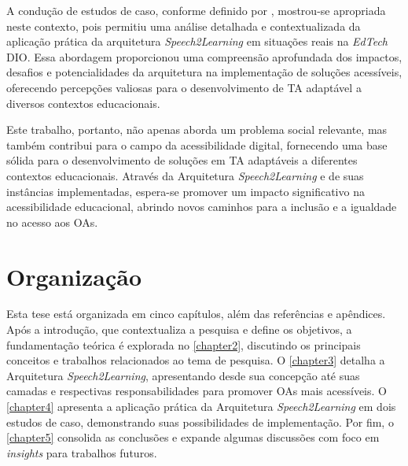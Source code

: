 A condução de estudos de caso, conforme definido por , mostrou-se apropriada neste contexto, pois permitiu uma análise detalhada e contextualizada da aplicação prática da arquitetura \textit{Speech2Learning} em situações reais na \textit{EdTech} DIO. Essa abordagem proporcionou uma compreensão aprofundada dos impactos, desafios e potencialidades da arquitetura na implementação de soluções acessíveis, oferecendo percepções valiosas para o desenvolvimento de TA adaptável a diversos contextos educacionais.

Este trabalho, portanto, não apenas aborda um problema social relevante, mas também contribui para o campo da acessibilidade digital, fornecendo uma base sólida para o desenvolvimento de soluções em TA adaptáveis a diferentes contextos educacionais. Através da Arquitetura \textit{Speech2Learning} e de suas instâncias implementadas, espera-se promover um impacto significativo na acessibilidade educacional, abrindo novos caminhos para a inclusão e a igualdade no acesso aos OAs.

\section{Organização}

Esta tese está organizada em cinco capítulos, além das referências e apêndices. Após a introdução, que contextualiza a pesquisa e define os objetivos, a fundamentação teórica é explorada no \autoref{chapter2}, discutindo os principais conceitos e trabalhos relacionados ao tema de pesquisa. O \autoref{chapter3} detalha a Arquitetura \textit{Speech2Learning}, apresentando desde sua concepção até suas camadas e respectivas responsabilidades para promover OAs mais acessíveis. O \autoref{chapter4} apresenta a aplicação prática da Arquitetura \textit{Speech2Learning} em dois estudos de caso, demonstrando suas possibilidades de implementação. Por fim, o \autoref{chapter5} consolida as conclusões e expande algumas discussões com foco em \textit{insights} para trabalhos futuros.